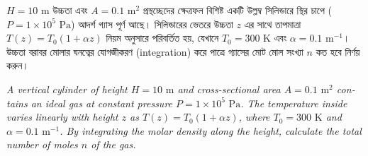 \documentclass[12pt, a4paper]{article}
\begin{document}
\begin{tcolorbox}[questionbox={প্রশ্ন (Question) 15}]
    \noindent
    $H = 10\text{ m}$ উচ্চতা এবং $A = 0.1\text{ m}^2$ প্রস্থচ্ছেদের ক্ষেত্রফল বিশিষ্ট একটি উল্লম্ব সিলিন্ডারে স্থির চাপে ($P = 1 \times 10^5\text{ Pa}$) আদর্শ গ্যাস পূর্ণ আছে। সিলিন্ডারের ভেতরে উচ্চতা $z$ এর সাথে তাপমাত্রা $T(z) = T_0 (1 + \alpha z)$ নিয়ম অনুসারে পরিবর্তিত হয়, যেখানে $T_0 = 300\text{ K}$ এবং $\alpha = 0.1\text{ m}^{-1}$। উচ্চতা বরাবর মোলার ঘনত্বের যোগজীকরণ (integration) করে পাত্রে গ্যাসের মোট মোল সংখ্যা $n$ কত হবে নির্ণয় করুন।
    
    \vspace{0.8em}
    \begin{english}
    \noindent\textit{\color{darkgray}
    A vertical cylinder of height $H = 10\text{ m}$ and cross-sectional area $A = 0.1\text{ m}^2$ contains an ideal gas at constant pressure $P = 1 \times 10^5\text{ Pa}$. The temperature inside varies linearly with height $z$ as $T(z) = T_0 (1 + \alpha z)$, where $T_0 = 300\text{ K}$ and $\alpha = 0.1\text{ m}^{-1}$. By integrating the molar density along the height, calculate the total number of moles $n$ of the gas.
    }
    \end{english}
\end{tcolorbox}
\end{document}
